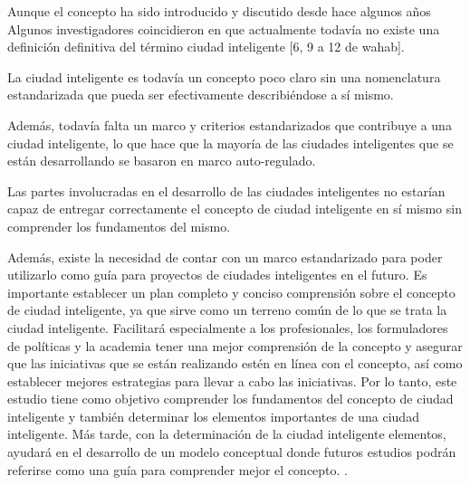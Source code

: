 \documentclass[a4paper,fleqn,spanish]{cas-dc}
\begin{document}





Aunque el concepto ha sido introducido y discutido desde hace algunos años
Algunos investigadores coincidieron en que actualmente todavía no existe una
definición definitiva del término ciudad inteligente [6, 9 a 12 de wahab].


La ciudad inteligente es todavía un concepto poco claro sin una nomenclatura
estandarizada que pueda ser efectivamente describiéndose a sí mismo.

Además, todavía falta un marco y criterios estandarizados que contribuye a una ciudad
inteligente, lo que hace que la mayoría de las ciudades inteligentes que se
están desarrollando se basaron en marco auto-regulado.

Las partes involucradas en el desarrollo de las ciudades inteligentes no
estarían capaz de entregar correctamente el concepto de ciudad inteligente en
sí mismo sin comprender los fundamentos del mismo.

Además, existe la necesidad de contar con un marco estandarizado para poder
utilizarlo como guía para proyectos de ciudades inteligentes en el futuro.
Es importante establecer un plan completo y conciso comprensión sobre el
concepto de ciudad inteligente, ya que sirve como un terreno común de lo que se
trata la ciudad inteligente.
Facilitará especialmente a los profesionales, los formuladores de políticas y
la academia tener una mejor comprensión de la concepto y asegurar que las
iniciativas que se están realizando estén en línea con el concepto, así como
establecer mejores estrategias para llevar a cabo las iniciativas.
Por lo tanto, este estudio tiene como objetivo comprender los fundamentos del
concepto de ciudad inteligente y también determinar los elementos importantes
de una ciudad inteligente.
Más tarde, con la determinación de la ciudad inteligente elementos, ayudará en
el desarrollo de un modelo conceptual donde futuros estudios podrán referirse
como una guía para comprender mejor el concepto.
\cite{wahab_systematic_2020}.
\end{document}
